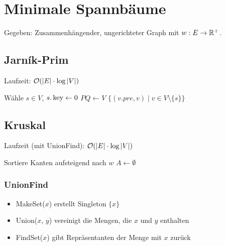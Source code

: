 \section*{Minimale Spannbäume}
Gegeben: Zusammenhängender, ungerichteter Graph mit $w: E \to \mathbb{R}^+$.

\subsection*{Jarn\'ik-Prim}
Laufzeit: $\mathcal{O}(|E| \cdot \log|V|)$

\begin{algorithm}[H]
	Wähle $s\in V$, $s.\operatorname{key} \gets 0$\;
	$PQ \gets V$\;
	\KwRet $\{(v.pre, v) \mid v \in V\setminus\{s\}\}$
\end{algorithm}

\subsection*{Kruskal}
Laufzeit (mit UnionFind): $\mathcal{O}(|E|\cdot\log|V|)$

\begin{algorithm}[H]
	Sortiere Kanten aufsteigend nach $w$\;
	$A \gets \emptyset$\;
\end{algorithm}

\subsubsection*{UnionFind}
\begin{itemize}
	\item MakeSet($x$) erstellt Singleton $\{x\}$
	\item Union($x$, $y$) vereinigt die Mengen, die $x$ und $y$ enthalten
	\item FindSet($x$) gibt Repräsentanten der Menge mit $x$ zurück
\end{itemize}
